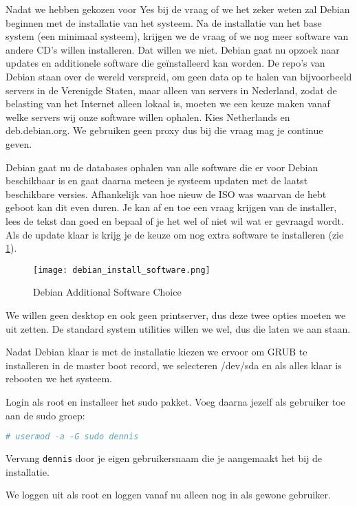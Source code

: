 Nadat we hebben gekozen voor Yes bij de vraag of we het zeker weten zal Debian beginnen met de installatie van het systeem. Na de installatie van het base system (een minimaal systeem), krijgen we de vraag of we nog meer software van andere CD's willen installeren. Dat willen we niet. Debian gaat nu opzoek naar updates en additionele software die ge\"installeerd kan worden. De repo's van Debian staan over de wereld verspreid, om geen data op te halen van bijvoorbeeld servers in de Verenigde Staten, maar alleen van servers in Nederland, zodat de belasting van het Internet alleen lokaal is, moeten we een keuze maken vanaf welke servers wij onze software willen ophalen. Kies Netherlands en deb.debian.org. We gebruiken geen proxy dus bij die vraag mag je continue geven.

Debian gaat nu de databases ophalen van alle software die er voor Debian beschikbaar is en gaat daarna meteen je systeem updaten met de laatst beschikbare versies. Afhankelijk van hoe nieuw de ISO was waarvan de hebt geboot kan dit even duren. Je kan af en toe een vraag krijgen van de installer, lees de tekst dan goed en bepaal of je het wel of niet wil wat er gevraagd wordt. Als de update klaar is krijg je de keuze om nog extra software te installeren (zie \ref{DebSoft}).

\begin{figure}[H]
	\centering
	\texttt{[image: debian\_install\_software.png]}
	\caption{Debian Additional Software Choice}
	\label{DebSoft}
\end{figure}

We willen geen desktop en ook geen printserver, dus deze twee opties moeten we uit zetten. De standard system utilities willen we wel, dus die laten we aan staan.

Nadat Debian klaar is met de installatie kiezen we ervoor om GRUB te installeren in de master boot record, we selecteren /dev/sda en als alles klaar is rebooten we het systeem.

Login als root en installeer het sudo pakket. Voeg daarna jezelf als gebruiker toe aan de sudo groep:
\begin{lstlisting}[language=bash]
# usermod -a -G sudo dennis
\end{lstlisting}
Vervang \texttt{dennis} door je eigen gebruikersnaam die je aangemaakt het bij de installatie.

We loggen uit als root en loggen vanaf nu alleen nog in als gewone gebruiker.
